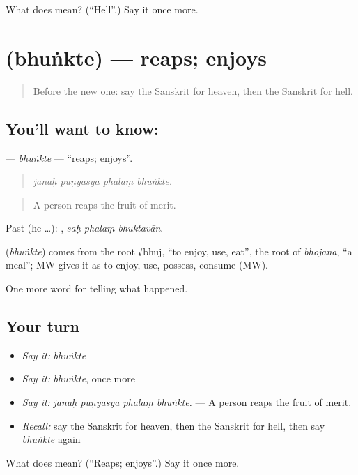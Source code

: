 \begin{tcolorbox}[breakable,colback=teal!4,colframe=teal!35!black,title={Before you move on}]
What does  mean? (\textquotedblleft{}Hell\textquotedblright{}.) Say it once more.
\end{tcolorbox}
\section[\texorpdfstring{\sk{भुंक्ते} (bhuṅkte)}{भुंक्ते (bhuṅkte)}]{ (bhuṅkte) — reaps; enjoys}

\label{lesson:SA-C338-bhunkte}



\begin{quote}
Before the new one: say the Sanskrit for heaven, then the Sanskrit for hell.
\end{quote}

\subsection*{You'll want to know: }
\textbf{} — \emph{bhuṅkte} — \textquotedblleft{}reaps; enjoys\textquotedblright{}.

\begin{quote}
   
\end{quote}

\begin{quote}
\emph{janaḥ puṇyasya phalaṃ bhuṅkte.}
\end{quote}

\begin{quote}
A person reaps the fruit of merit.
\end{quote}

Past (he …):   , \emph{saḥ phalaṃ bhuktavān}.

\begin{cousinweb}
\textbf{} (\emph{bhuṅkte}) comes from the root √bhuj, \textquotedblleft{}to enjoy, use, eat\textquotedblright{}, the root of \emph{bhojana}, \textquotedblleft{}a meal\textquotedblright{}; MW gives it as to enjoy, use, possess, consume (MW).
\end{cousinweb}

\begin{grammarlens}[title={What you've built}]
One more word for telling what happened.
\end{grammarlens}

\subsection*{Your turn}
\begin{itemize}
\raggedright
  \item \emph{Say it:} \emph{bhuṅkte}
  \item \emph{Say it:} \emph{bhuṅkte}, once more
  \item \emph{Say it:} \emph{janaḥ puṇyasya phalaṃ bhuṅkte.} — A person reaps the fruit of merit.
  \item \emph{Recall:} say the Sanskrit for heaven, then the Sanskrit for hell, then say \emph{bhuṅkte} again
\end{itemize}

\begin{tcolorbox}[breakable,colback=teal!4,colframe=teal!35!black,title={Before you move on}]
What does  mean? (\textquotedblleft{}Reaps; enjoys\textquotedblright{}.) Say it once more.
\end{tcolorbox}
